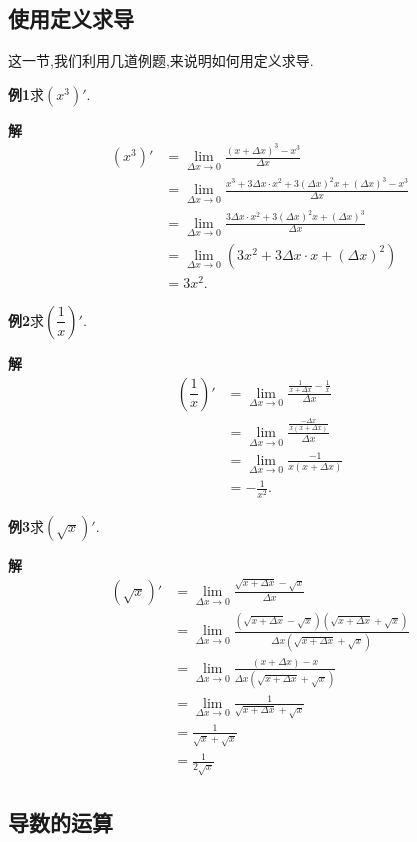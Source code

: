 \documentclass{article}
\begin{document}
\subsection{使用定义求导}
这一节,我们利用几道例题,来说明如何用定义求导.
\par\textbf{例1}\quad 求$\left(x^3\right)'$.
\par\textbf{解}\quad 
\begin{align*}
\left(x^3\right)'
&=\lim\limits_{\Delta x\to0}\frac{(x+\Delta x)^3-x^3}{\Delta x}\\
&=\lim\limits_{\Delta x\to0}\frac{x^3+3\Delta x \cdot x^2+3(\Delta x)^2x+(\Delta x)^3-x^3}{\Delta x}\\
&=\lim\limits_{\Delta x\to0}\frac{3\Delta x \cdot x^2+3(\Delta x)^2x+(\Delta x)^3}{\Delta x}\\
&=\lim\limits_{\Delta x\to0}\left(3x^2+3\Delta x\cdot x+(\Delta x)^2\right)\\
&=3x^2.
\end{align*} 
\par\textbf{例2}\quad 求$\left(\dfrac{1}{x}\right)'$.
\par\textbf{解}\quad
\begin{align*}
\left(\dfrac{1}{x}\right)'
&=\lim\limits_{\Delta x\to0}\frac{\frac{1}{x+\Delta x}-\frac{1}{x}}{\Delta x}\\
&=\lim\limits_{\Delta x\to0}\frac{\frac{-\Delta x}{x(x+\Delta x)}}{\Delta x}\\
&=\lim\limits_{\Delta x\to0}\frac{-1}{x(x+\Delta x)}\\
&=-\frac{1}{x^2}.
\end{align*}
\par\textbf{例3}\quad 求$\left(\sqrt{x}\right)'$.
\par\textbf{解}\quad
\begin{align*}
\left(\sqrt{x}\right)'
&=\lim\limits_{\Delta x\to0}\frac{\sqrt{x+\Delta x}-\sqrt{x}}{\Delta x}\\
&=\lim\limits_{\Delta x\to0}\frac{(\sqrt{x+\Delta x}-\sqrt{x})(\sqrt{x+\Delta x}+\sqrt{x})}{\Delta x(\sqrt{x+\Delta x}+\sqrt{x})}\\
&=\lim\limits_{\Delta x\to0}\frac{(x+\Delta x)-x}{\Delta x(\sqrt{x+\Delta x}+\sqrt{x})}\\
&=\lim\limits_{\Delta x\to0}\frac{1}{\sqrt{x+\Delta x}+\sqrt{x}}\\
&=\frac{1}{\sqrt{x}+\sqrt{x}}\\
&=\frac{1}{2\sqrt{x}}
\end{align*}
\subsection{导数的运算}
\end{document}
